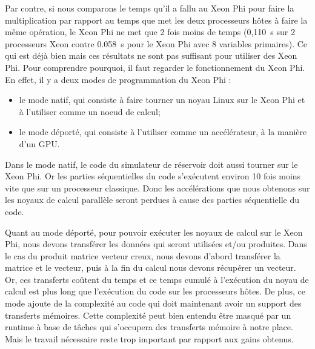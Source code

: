 Par contre, si nous comparons le temps qu'il a fallu au Xeon Phi pour faire la multiplication par rapport au temps que met les deux processeurs hôtes à faire la même opération, le Xeon Phi ne met que 2 fois moins de temps (0,110~s sur 2 processeurs Xeon contre 0.058~s pour le Xeon Phi avec 8 variables primaires).
%
Ce qui est déjà bien mais ces résultats ne sont pas suffisant pour utiliser des Xeon Phi.
%
Pour comprendre pourquoi, il faut regarder le fonctionnement du Xeon Phi.
%
En effet, il y a deux modes de programmation du Xeon Phi :
\begin{itemize}
    \item le mode natif, qui consiste à faire tourner un noyau Linux sur le Xeon Phi et à l'utiliser comme un noeud de calcul;
    \item le mode déporté, qui consiste à l'utiliser comme un accélérateur, à la manière d'un GPU.
\end{itemize}

Dans le mode natif, le code du simulateur de réservoir doit aussi tourner sur le Xeon Phi.
%
Or les parties séquentielles du code s'exécutent environ 10 fois moins vite que sur un processeur classique.
%
Donc les accélérations que nous obtenons sur les noyaux de calcul parallèle seront perdues à cause des parties séquentielle du code.


Quant au mode déporté, pour pouvoir exécuter les noyaux de calcul sur le Xeon Phi, nous devons transférer les données qui seront utilisées et/ou produites.
%
Dans le cas du produit matrice vecteur creux, nous devons d'abord transférer la matrice et le vecteur, puis à la fin du calcul nous devons récupérer un vecteur.
%
Or, ces transferts coûtent du temps et ce temps cumulé à l'exécution du noyau de calcul est plus long que l'exécution du code sur les processeurs hôtes.
%
De plus, ce mode ajoute de la complexité au code qui doit maintenant avoir un support des transferts mémoires.
%
Cette complexité peut bien entendu être masqué par un runtime à base de tâches qui s'occupera des transferts mémoire à notre place.
%
Mais le travail nécessaire reste trop important par rapport aux gains obtenus.
